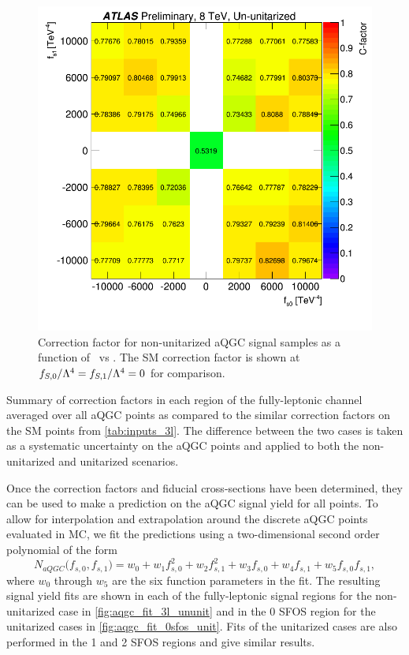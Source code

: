 \begin{figure}[htb]
\centering
\includegraphics[width=.8\textwidth]{figures/aQGC/cfactor_chargesum.png}
\caption{Correction factor for non-unitarized aQGC signal samples as a function of \fszero~vs \fsone.
The SM correction factor is shown at $f_{S,0}/\Lambda^4=f_{S,1}/\Lambda^4=0$ for comparison.}
\label{fig:aqgc_cfactor_3l}
\end{figure}


\begin{table}[htb]
\centering

\caption{Summary of correction factors in each region of the fully-leptonic channel 
averaged over all aQGC points as compared to the similar correction factors on the SM 
points from \tab\ref{tab:inputs_3l}. The difference between the two cases
is taken as a systematic uncertainty on the aQGC points and applied to both the 
non-unitarized and unitarized scenarios.}
\label{tab:aqgc_cfactor_3l_summary}
\end{table}

Once the correction factors and fiducial cross-sections have been determined,
they can be used to make a prediction on the aQGC signal yield 
for all points.  To allow for interpolation and extrapolation
around the discrete aQGC points evaluated in MC, we 
fit the predictions using a two-dimensional second order polynomial of 
the form
\begin{equation}
N_{aQGC}\big(f_{s,0},f_{s,1}\big) = w_0 + w_1 f_{s,0}^2 + w_2 f_{s,1}^2
+ w_3 f_{s,0} + w_4  f_{s,1} + w_5 f_{s,0} f_{s,1},
\label{eq:aqgc_fit_function}
\end{equation}
where $w_0$ through $w_5$ are the six function parameters in the fit.
The resulting signal yield fits are shown in each of the fully-leptonic signal 
regions for the non-unitarized case in \fig\ref{fig:aqgc_fit_3l_ununit}
and in the 0 SFOS region
for the unitarized cases in \fig\ref{fig:aqgc_fit_0sfos_unit}.
Fits of the unitarized cases are also performed in the 1 and 2 SFOS regions and give similar results. 



